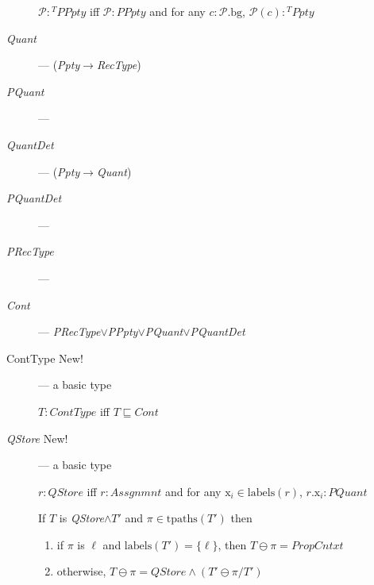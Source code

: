 \begin{description}
        $\mathcal{P}:{^T\textit{PPpty}}$ iff
  $\mathcal{P}:\textit{PPpty}$ and for any $c:\mathcal{P}.\text{bg}$, $\mathcal{P}(c):{^T\textit{Ppty}}$
        
      \item[\textnormal{\textit{Quant}}] ---
        (\textit{Ppty}$\rightarrow$\textit{RecType})
        
      \item[\textnormal{\textit{PQuant}}] --- 
        
      \item[\textnormal{\textit{QuantDet}}] ---
        (\textit{Ppty}$\rightarrow$\textit{Quant})
        
      \item[\textnormal{\textit{PQuantDet}}] ---
        
      \item[\textnormal{\textit{PRecType}}] ---
          

    \item[\textnormal{\textit{Cont}}] ---
      \textit{PRecType}$\vee$\textit{PPpty}$\vee$\textit{PQuant}$\vee$\textit{PQuantDet}

      
    \item[\textnormal{ContType} New!] ---  a basic type

      $T : \textit{ContType}$ iff $T\sqsubseteq\textit{Cont}$

      
    \item[\textnormal{\textit{QStore}} New!] --- a basic type

      $r:\textit{QStore}$ iff $r:Assgnmnt$
and for any $\text{x}_i\in\mathrm{labels}(r)$,
$r.\text{x}_i:\textit{PQuant}$

If $T$ is \textit{QStore}$\wedge T'$ and
  $\pi\in\mathrm{tpaths}(T')$ then
  \begin{enumerate}
    
  \item if $\pi$ is $\ell$ and $\mathrm{labels}(T')=\{\ell\}$, then $T\ominus\pi=\textit{PropCntxt}$
    
  \item otherwise, $T\ominus\pi= \textit{QStore}\wedge(T'\ominus \pi/T')$
  \end{enumerate}


\end{description}
